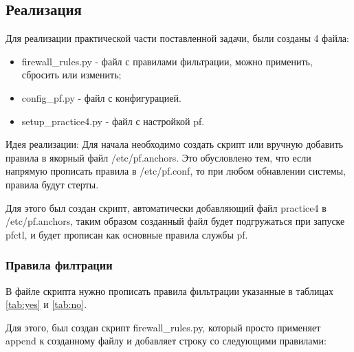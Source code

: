 \documentclass[areasetadvanced]{scrartcl}
\begin{document}
\subsection{Реализация}

Для реализации практической части поставленной задачи, были созданы 4 файла:

\begin{itemize}
    \item firewall\_rules.py - файл с правилами фильтрации, можно применить, сбросить или изменить;
    \item config\_pf.py - файл с конфигурацией.
    \item setup\_practice4.py - файл с настройкой pf.
\end{itemize}

Идея реализации: 
Для начала необходимо создать скрипт или вручную добавить правила в якорный файл /etc/pf.anchors. Это обусловлено тем,
что если напрямую прописать правила в /etc/pf.conf, то при любом обнавлении системы, правила будут стерты. 

Для этого был создан скрипт, автоматически добавляющий файл practice4 в /etc/pf.anchors, таким образом созданный файл будет подгружаться
при запуске pfctl, и будет прописан как основные правила службы pf. 


\subsubsection{Правила филтрации}

В файле скрипта нужно прописать правила фильтрации указанные в таблицах \ref{tab:yes} и \ref{tab:no}. 

Для этого, был создан скрипт firewall\_rules.py, который просто применяет append к созданному файлу и добавляет строку со следующими правилами:
\end{document}
